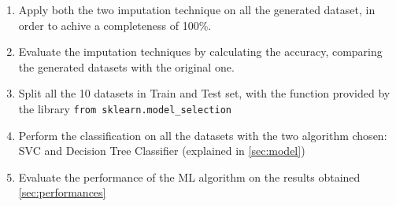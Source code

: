 \documentclass{article}
\begin{document}
\begin{enumerate}
    \item Apply both the two imputation technique on all the generated dataset, in order to achive a completeness of 100\%. 
    \item Evaluate the imputation techniques by calculating the accuracy, comparing the generated datasets with the original one.
    \item Split all the 10 datasets in Train and Test set, with the function provided by the library \texttt{from sklearn.model\_selection}
    \item Perform the classification on all the datasets with the two algorithm chosen: SVC and Decision Tree Classifier (explained in \ref{sec:model})
    \item Evaluate the performance of the ML algorithm on the results obtained \ref{sec:performances}
\end{enumerate}


\end{document}
